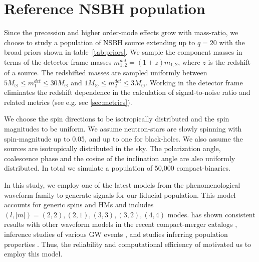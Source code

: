 \section{ Reference NSBH population } \label{sec:ref_pop}
Since the precession and higher order-mode effects grow with mass-ratio, we choose to study a population of NSBH source extending up to $q = 20$ with the broad priors shown in table~\ref{tab:priors}. We sample the component masses in terms of the detector frame masses $m_{1,2}^{det} = (1+z)m_{1,2}$, where $z$ is the redshift of a source. The redshifted masses are sampled uniformly between $5 M_{\odot} \leq m_1^{det} \leq 30 M_{\odot}$ and $1 M_{\odot} \leq m_2^{det} \leq 3 M_{\odot}$. Working in the detector frame eliminates the redshift dependence in the calculation of signal-to-noise ratio and related metrics (see e.g. sec \ref{sec:metrics}).


We choose the spin directions to be isotropically distributed and the spin magnitudes to be uniform. We assume neutron-stars are slowly spinning with spin-magnitude up to 0.05, and up to one for black-holes. We also assume the sources are isotropically distributed in the sky. The polarization angle, coalescence phase and the cosine of the inclination angle are also uniformly distributed. In total we simulate a population of 50,000 compact-binaries.

In this study, we employ one of the latest models from the phenomenological waveform family  \cite{Pratten:2020ceb} to generate signals for our fiducial population. This model accounts for generic spins and HMs and includes $(l, |m|) = (2, 2), (2, 1), (3, 3), (3, 2), (4, 4)$ modes.  has shown consistent results with other waveform models in the recent compact-merger catalogs \cite{LIGOScientific:2021djp, Nitz:2021uxj, Olsen:2022pin}, inference studies of various GW events \cite{Estelles:2021jnz, Krishnendu:2021cyi}, and studies inferring population properties \cite{Tiwari:2021yvr, Zhu:2021jbw}. Thus, the reliability and computational efficiency of  motivated us to employ this model.  

